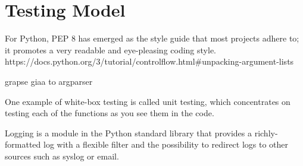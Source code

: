 \section{Testing Model}
For Python, PEP 8 has emerged as the style guide that most projects adhere to; it promotes a very readable and eye-pleasing coding style. https://docs.python.org/3/tutorial/controlflow.html#unpacking-argument-lists


grapse giaa to argparser

One example of white-box testing is called unit testing, which concentrates
on testing each of the functions as you see them in the code.

Logging is a module in the Python standard library that provides a richly-formatted log with a flexible filter and the possibility to redirect logs to other sources such as syslog or email.

